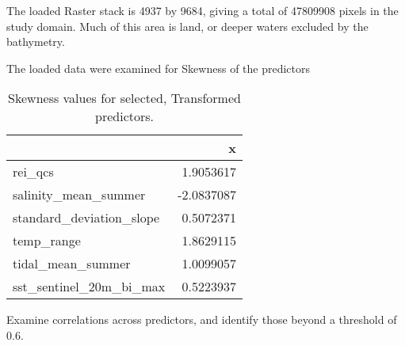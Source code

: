 \documentclass[
  11pt,
]{article}
\begin{document}
The loaded Raster stack is 4937 by 9684, giving a total of 47809908
pixels in the study domain. Much of this area is land, or deeper waters
excluded by the bathymetry.

The loaded data were examined for Skewness of the predictors

\begin{table}[!h]
\centering
\caption{\label{tab:SkewTable}Skewness values for selected, Transformed predictors.}
\centering
\begin{tabular}[t]{lr}
\toprule
  & x\\
\midrule
rei\_qcs & 1.9053617\\
salinity\_mean\_summer & -2.0837087\\
standard\_deviation\_slope & 0.5072371\\
temp\_range & 1.8629115\\
tidal\_mean\_summer & 1.0099057\\
\addlinespace
sst\_sentinel\_20m\_bi\_max & 0.5223937\\
\bottomrule
\end{tabular}
\end{table}

Examine correlations across predictors, and identify those beyond a
threshold of 0.6.
\end{document}
